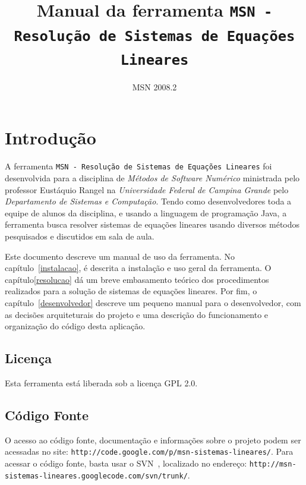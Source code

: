 \documentclass[a4paper,10pt]{report}
\newcommand{\ferramenta}{\texttt{MSN - Resolução de Sistemas de Equações Lineares}\xspace}
\begin{document}
\title{Manual da ferramenta \ferramenta}
\author{MSN 2008.2}



\maketitle

\tableofcontents

\chapter{Introdução}
\label{intro}

A ferramenta \ferramenta foi desenvolvida para a disciplina de \textit{Métodos de Software Numérico} ministrada pelo professor Eustáquio Rangel na \textit{Universidade Federal de Campina Grande} pelo \textit{Departamento de Sistemas e Computação}. Tendo como desenvolvedores toda a equipe de alunos da disciplina, e usando a linguagem de programação Java, a ferramenta busca resolver sistemas de equações lineares usando diversos métodos pesquisados e discutidos em sala de aula.

Este documento descreve um manual de uso da ferramenta. No capítulo~\ref{instalacao}, é descrita a instalação e uso geral da ferramenta. O capítulo\ref{resolucao} dá um breve embasamento teórico dos procedimentos realizados para a solução de sistemas de equações lineares. Por fim, o capítulo~\ref{desenvolvedor} descreve um pequeno manual para o desenvolvedor, com as decisões arquiteturais do projeto e uma descrição do funcionamento e organização do código desta aplicação.

\section{Licença}

Esta ferramenta está liberada sob a licença GPL 2.0\cite{gpl}.

\section{Código Fonte}

O acesso ao código fonte, documentação e informações sobre o projeto podem ser acessadas no site: \texttt{http://code.google.com/p/msn-sistemas-lineares/}. Para acessar o código fonte, basta usar o SVN~\cite{svn}, localizado no endereço: \texttt{http://msn-sistemas-lineares.googlecode.com/svn/trunk/}.
\end{document}
